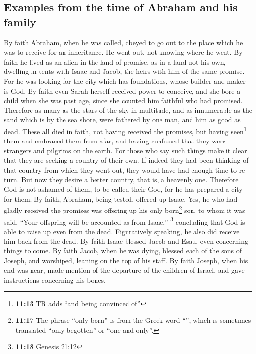 \begin{paracol}{2}
\begin{otherlanguage}{english}
\hypertarget{examples-from-the-time-of-abraham-and-his-family}{%
\subsection{Examples from the time of Abraham and his
family}\label{examples-from-the-time-of-abraham-and-his-family}}

 By faith Abraham, when he was called, obeyed to go out to
the place which he was to receive for an inheritance. He went out, not
knowing where he went.  By faith he lived as an alien in
the land of promise, as in a land not his own, dwelling in tents with
Isaac and Jacob, the heirs with him of the same promise. 
For he was looking for the city which has foundations, whose builder and
maker is God.  By faith even Sarah herself received power
to conceive, and she bore a child when she was past age, since she
counted him faithful who had promised.  Therefore as many
as the stars of the sky in multitude, and as innumerable as the sand
which is by the sea shore, were fathered by one man, and him as good as
dead.  These all died in faith, not having received the
promises, but having seen\footnote{\textbf{11:13} TR adds ``and being
  convinced of''} them and embraced them from afar, and having confessed
that they were strangers and pilgrims on the earth.  For
those who say such things make it clear that they are seeking a country
of their own.  If indeed they had been thinking of that
country from which they went out, they would have had enough time to
return.  But now they desire a better country, that is, a
heavenly one. Therefore God is not ashamed of them, to be called their
God, for he has prepared a city for them.  By faith,
Abraham, being tested, offered up Isaac. Yes, he who had gladly received
the promises was offering up his only born\footnote{\textbf{11:17} The
  phrase ``only born'' is from the Greek word ``'',
  which is sometimes translated ``only begotten'' or ``one and only''.}
son,  to whom it was said, ``Your offspring will be
accounted as from Isaac,'' \footnote{\textbf{11:18} Genesis 21:12}
 concluding that God is able to raise up even from the
dead. Figuratively speaking, he also did receive him back from the dead.
 By faith Isaac blessed Jacob and Esau, even concerning
things to come.  By faith Jacob, when he was dying,
blessed each of the sons of Joseph, and worshiped, leaning on the top of
his staff.  By faith Joseph, when his end was near, made
mention of the departure of the children of Israel, and gave
instructions concerning his bones.


\end{otherlanguage}
\end{paracol}
